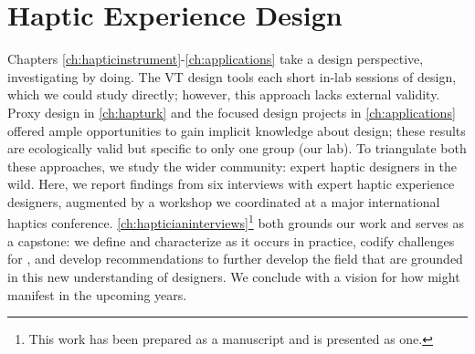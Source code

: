 
\chapter{Haptic Experience Design}
\label{ch:hapticianinterviews}

 Chapters \ref{ch:hapticinstrument}-\ref{ch:applications}  take a design perspective, investigating by doing.
The VT design tools each  short in-lab sessions of design, which we could study directly; however, this approach lacks external validity.
Proxy design in \autoref{ch:hapturk} and the focused design projects in \autoref{ch:applications} offered ample opportunities to gain implicit knowledge about design; these results are ecologically valid but specific to only one group (our lab).
To triangulate both these approaches, we study the wider community: expert haptic designers in the wild.
Here, we report findings from six interviews with expert haptic experience designers, augmented by a workshop we coordinated at a major international haptics conference.
\autoref{ch:hapticianinterviews}\footnote{This work has been prepared as a manuscript and is presented as one.} both grounds our work and serves as a capstone: we define and characterize \haxd as it occurs in practice, codify challenges for \haxd, and develop recommendations to further develop the field that are grounded in this new understanding of designers.
We conclude with a vision for how \haxd might manifest in the upcoming years.

